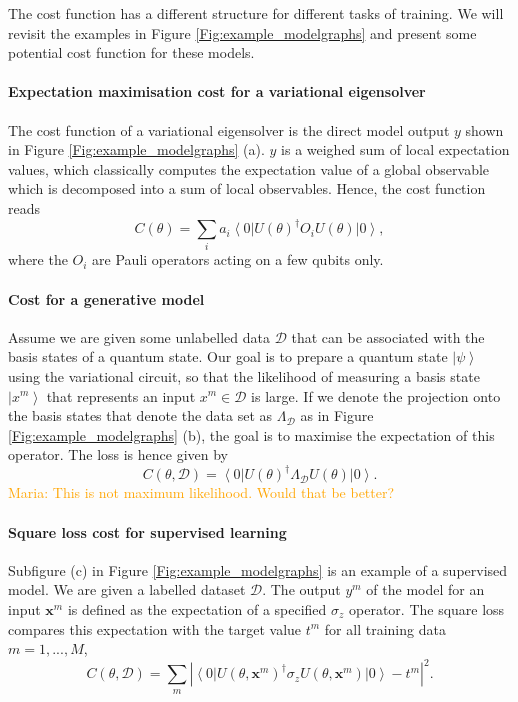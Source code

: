 \documentclass[aps,pra,10pt,twocolumn,groupedaddress,nofootinbib]{revtex4-1}
\theoremstyle{plain}
\newcommand{\ket}[1]{\ensuremath{\left| #1 \right \rangle}}
\newcommand{\bra}[1]{\ensuremath{\left \langle #1 \right |}}
\newcommand{\bx}{\mathbf{x}}
\newcommand{\maria}[1]{\textcolor{orange}{Maria: #1}}
\begin{document}
The cost function has a different structure for different tasks of training. We will revisit the examples in Figure \ref{Fig:example_modelgraphs} and present some potential cost function for these models. \\


\paragraph{Expectation maximisation cost for a variational eigensolver}

The cost function of a variational eigensolver is the direct model output $y$ shown in Figure \ref{Fig:example_modelgraphs} (a). $y$ is a weighed sum of local expectation values, which classically computes the expectation value of a global observable which is decomposed into a sum of local observables. Hence, the cost function reads
\[ C(\theta) = \sum_i a_i \bra{0}U(\theta)^{\dagger} O_i U(\theta)\ket{0}, \]
where the $O_i$ are Pauli operators acting on a few qubits only.


\paragraph{Cost for a generative model}
Assume we are given some unlabelled data $\mathcal{D}$ that can be associated with the basis states of a quantum state. Our goal is to prepare a quantum state $\ket{\psi}$ using the variational circuit, so that the likelihood of measuring a basis state $\ket{x^m}$ that represents an input $x^m \in \mathcal{D}$ is large. If we denote the projection onto the basis states that denote the data set as $\Lambda_{\mathcal{D}}$ as in Figure \ref{Fig:example_modelgraphs} (b), the goal is to maximise the expectation of this operator. The loss is hence given by
\[ C(\theta, \mathcal{D}) = \bra{0}U(\theta)^{\dagger} \Lambda_{\mathcal{D}} U(\theta)\ket{0}.\]
\maria{This is not maximum likelihood. Would that be better?}

\paragraph{Square loss cost for supervised learning}
Subfigure (c) in Figure \ref{Fig:example_modelgraphs} is an example of a supervised model. We are given a labelled dataset $\mathcal{D}$. The output $y^m$ of the model for an input $\bx^m$ is defined as the expectation of a specified $\sigma_z$ operator. The square loss compares this expectation with the target value $t^m$ for all training data $m=1,...,M$,
\[ C(\theta, \mathcal{D}) = \sum_{m} |\bra{0}U(\theta, \bx^m)^{\dagger} \sigma_z U(\theta, \bx^m)\ket{0}-t^m|^2. \]
\end{document}
